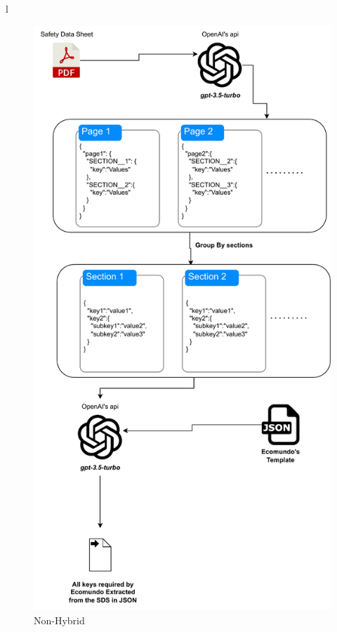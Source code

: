 l\documentclass[a4paper,12pt,twoside]{report}
\begin{document}
\begin{figure}[H]
		\includegraphics[width=\textwidth, height=\textheight/2, keepaspectratio ]{images/Non-Hybrid}
	\caption[How the Non-Hybrid code works]{Non-Hybrid}
\label{Non-Hybrid}
\end{figure}
\end{document}
